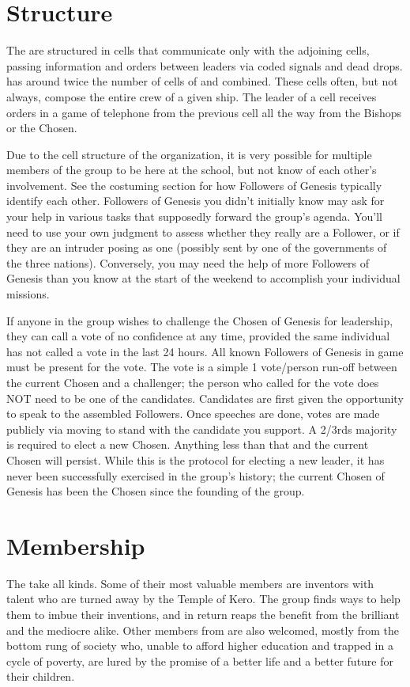 \documentclass[blue]{GL2020}
\begin{document}
\section*{Structure}
The \pGoaties{} are structured in cells that communicate only with the adjoining cells, passing information and orders between leaders via coded signals and dead drops. \pShip{} has around twice the number of cells of \pTech{} and \pFarm{} combined. These cells often, but not always, compose the entire crew of a given ship. The leader of a cell receives orders in a game of telephone from the previous cell all the way from the Bishops or the Chosen.

Due to the cell structure of the organization, it is very possible for multiple members of the group to be here at the school, but not know of each other's involvement. See the costuming section for how Followers of Genesis typically identify each other. Followers of Genesis you didn't initially know may ask for your help in various tasks that supposedly forward the group’s agenda. You'll need to use your own judgment to assess whether they really are a Follower, or if they are an intruder posing as one (possibly sent by one of the governments of the three nations). Conversely, you may need the help of more Followers of Genesis than you know at the start of the weekend to accomplish your individual missions.

If anyone in the group wishes to challenge the Chosen of Genesis for leadership, they can call a vote of no confidence at any time, provided the same individual has not called a vote in the last 24 hours. All known Followers of Genesis in game must be present for the vote. The vote is a simple 1 vote/person run-off between the current Chosen and a challenger; the person who called for the vote does NOT need to be one of the candidates. Candidates are first given the opportunity to speak to the assembled Followers. Once speeches are done, votes are made publicly via moving to stand with the candidate you support. A 2/3rds majority is required to elect a new Chosen. Anything less than that and the current Chosen will persist. While this is the protocol for electing a new leader, it has never been successfully exercised in the group’s history; the current Chosen of Genesis has been the Chosen since the founding of the group.

\section*{Membership}
The \pGoaties{} take all kinds. Some of their most valuable members are \pTech{} inventors with talent who are turned away by the Temple of Kero. The group finds ways to help them to imbue their inventions, and in return reaps the benefit from the brilliant and the mediocre alike. Other members from \pTech{} are also welcomed, mostly from the bottom rung of society who, unable to afford higher education and trapped in a cycle of poverty, are lured by the promise of a better life and a better future for their children.
\end{document}
